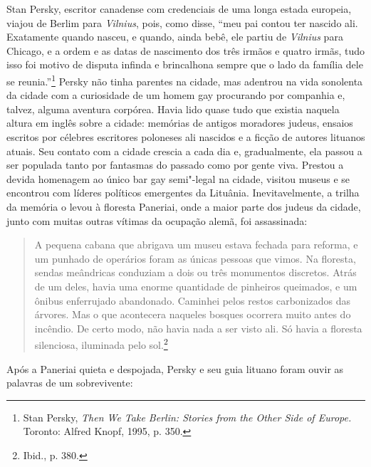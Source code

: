 %

Stan Persky, escritor canadense com credenciais de uma longa estada
europeia, viajou de Berlim para \textit{Vilnius}, pois, como disse, ``meu pai
contou ter nascido ali. Exatamente quando nasceu, e quando, ainda bebê,
ele partiu de \textit{Vilnius} para Chicago, e a ordem e as datas de nascimento
dos três irmãos e quatro irmãs, tudo isso foi motivo de disputa infinda
e brincalhona sempre que o lado da família dele se reunia.''\footnote{Stan Persky, \textit{Then We Take Berlin: Stories from the Other Side of Europe.} Toronto: Alfred Knopf, 1995, p. 350.} Persky não tinha parentes na cidade, mas adentrou na vida sonolenta da cidade com a
curiosidade de um homem gay procurando por companhia e, talvez, alguma
aventura corpórea. Havia lido quase tudo que existia naquela altura em
inglês sobre a cidade: memórias de antigos moradores judeus, ensaios
escritos por célebres escritores poloneses ali nascidos e a ficção de
autores lituanos atuais. Seu contato com a cidade crescia a cada dia e,
gradualmente, ela passou a ser populada tanto por fantasmas do passado
como por gente viva. Prestou a devida homenagem ao único bar gay
semi"-legal na cidade, visitou museus e se encontrou com líderes
políticos emergentes da Lituânia. Inevitavelmente, a trilha da memória o
levou à floresta Paneriai, onde a maior parte dos judeus da cidade,
junto com muitas outras vítimas da ocupação alemã, foi assassinada:

\begin{quote}
A pequena cabana que abrigava um museu estava fechada para reforma, e um
punhado de operários foram as únicas pessoas que vimos. Na floresta,
sendas meândricas conduziam a dois ou três monumentos discretos. Atrás
de um deles, havia uma enorme quantidade de pinheiros queimados, e um
ônibus enferrujado abandonado. Caminhei pelos restos carbonizados das
árvores. Mas o que acontecera naqueles bosques ocorrera muito antes do
incêndio. De certo modo, não havia nada a ser visto ali. Só havia a
floresta silenciosa, iluminada pelo sol.\footnote{Ibid., p. 380.}
\end{quote}

Após a Paneriai quieta e despojada, Persky e seu guia lituano foram
ouvir as palavras de um sobrevivente:

